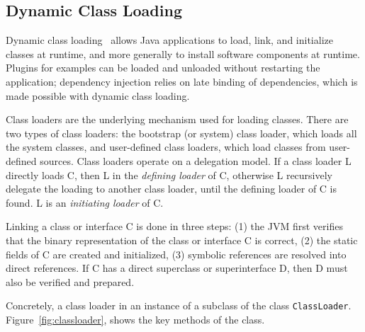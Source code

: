 \subsection{Dynamic Class Loading}
Dynamic class loading~\cite{liang_dynamic_nodate} allows Java applications to load, link, and initialize classes at runtime, and more generally to install software components at runtime. Plugins for examples can be loaded and unloaded without restarting the application; dependency injection relies on late binding of dependencies, which is made possible with dynamic class loading. 

Class loaders are the underlying mechanism used for loading classes. 
There are two types of class loaders: the bootstrap (or system) class loader, which loads all the system classes, and user-defined class loaders, which load classes from user-defined sources.
Class loaders operate on a delegation model. If a class loader L directly loads C, then L in the \textit{defining loader} of C, otherwise L recursively delegate the loading to another class loader, until the defining loader of C is found. L is an \textit{initiating loader} of C. 

Linking a class or interface C is done in three steps: (1) the JVM first verifies that the binary representation of the class or interface C is correct, (2) the static fields of C are created and initialized, (3) symbolic references are resolved into direct references. If C has a direct superclass or superinterface D, then D must also be verified and prepared. 

Concretely, a class loader in an instance of a subclass of the class \verb|ClassLoader|. 
Figure~\ref{fig:classloader}, shows the key methods of the class.


